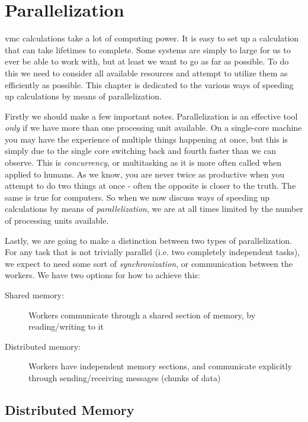 \documentclass[Thesis.tex]{subfiles}
\begin{document}
\chapter{Parallelization}
\label{chp:parallelization}

\glsresetall

\Gls{vmc} calculations take a lot of computing power. It is easy
to set up a calculation that can take lifetimes to complete. Some systems are
simply to large for us to ever be able to work with, but at least we want to go
as far as possible. To do this we need to consider all available resources and
attempt to utilize them as efficiently as possible. This chapter is dedicated to
the various ways of speeding up calculations by means of parallelization.

Firstly we should make a few important notes. Parallelization is an effective
tool \emph{only} if we have more than one processing unit available. On a
single-core machine you may have the experience of multiple things
happening at once, but this is simply due to the single core switching back and
fourth faster than we can observe. This is \emph{concurrency}, or multitasking
as it is more often called when applied to humans. As we know, you are never
twice as productive when you attempt to do two things at once - often the
opposite is closer to the truth. The same is true for computers. So when we now
discuss ways of speeding up calculations by means of \emph{parallelization}, we are
at all times limited by the number of processing units available.

Lastly, we are going to make a distinction between two types of parallelization.
For any task that is not trivially parallel (i.e. two completely independent
tasks), we expect to need some sort of \emph{synchronization}, or communication
between the workers. We have two options for how to achieve this:

\begin{description}
\item[Shared memory:] Workers communicate through a shared section of memory, by
  reading/writing to it
  \item[Distributed memory:] Workers have independent memory sections, and
    communicate explicitly through sending/receiving messages (chunks of data)
\end{description}

\section{Distributed Memory}
\end{document}
